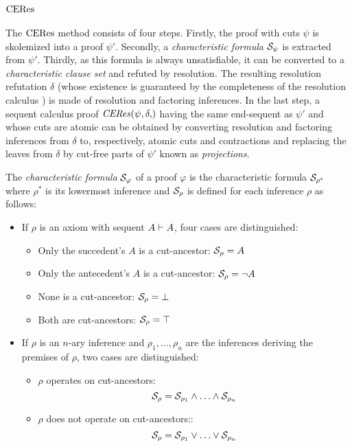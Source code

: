\section{$\mathrm{CERes}$}
\label{sec:CERes}


The $\mathrm{CERes}$ method consists of four steps. Firstly, the proof with cuts $\psi$ is skolemized into a proof $\psi'$. Secondly, a \emph{characteristic formula} $\mathcal{S}_{\psi}$ is extracted from $\psi'$. Thirdly, as this formula is always unsatisfiable, it can be converted to a \emph{characteristic clause set} and refuted by resolution. The resulting resolution refutation $\delta$ (whose existence is guaranteed by the completeness of the resolution calculus \cite{ToDo}) is made of resolution and factoring inferences. In the last step, a sequent calculus proof $\CEResNF{\psi,\delta}$ having the same end-sequent as $\psi'$ and whose cuts are atomic can be obtained by converting resolution and factoring inferences from $\delta$ to, respectively, atomic cuts and contractions and replacing the leaves from $\delta$ by cut-free parts of $\psi'$ known as \emph{projections}.



\begin{definition}
\label{definition:PertinentStruct}
The \emph{characteristic formula} $\mathcal{S}_{\varphi}$ of a proof $\varphi$ is the characteristic formula $\mathcal{S}_{\rho^*}$ where $\rho^*$ is its lowermost inference and $\mathcal{S}_{\rho}$ is defined for each inference $\rho$ as follows:

\begin{itemize}
	\item If $\rho$ is an axiom with sequent $A \vdash A$, four cases are distinguished:
	\begin{itemize}	 	
	 	\item Only the succedent's $A$ is a cut-ancestor: $\mathcal{S}_{\rho} = A$
	 	\item Only the antecedent's $A$ is a cut-ancestor: $\mathcal{S}_{\rho} = \neg A $
	 	\item None is a cut-ancestor: $\mathcal{S}_{\rho} = \bot $
	 	\item Both are cut-ancestors: $\mathcal{S}_{\rho} = \top$
	\end{itemize}

	\item If $\rho$ is an $n$-ary inference and $\rho_1,\ldots,\rho_n$ are the inferences deriving the premises of $\rho$, two cases are distinguished:
	\begin{itemize}
		\item $\rho$ operates on cut-ancestors:
$$
\mathcal{S}_{\rho} = 
		\mathcal{S}_{\rho_1} \wedge \ldots \wedge \mathcal{S}_{\rho_n}
$$

	\item $\rho$ does not operate on cut-ancestors::
$$
\mathcal{S}_{\rho} = 
		\mathcal{S}_{\rho_1} \vee \ldots \vee \mathcal{S}_{\rho_n}
$$
	\end{itemize}
\end{itemize}
\end{definition}



